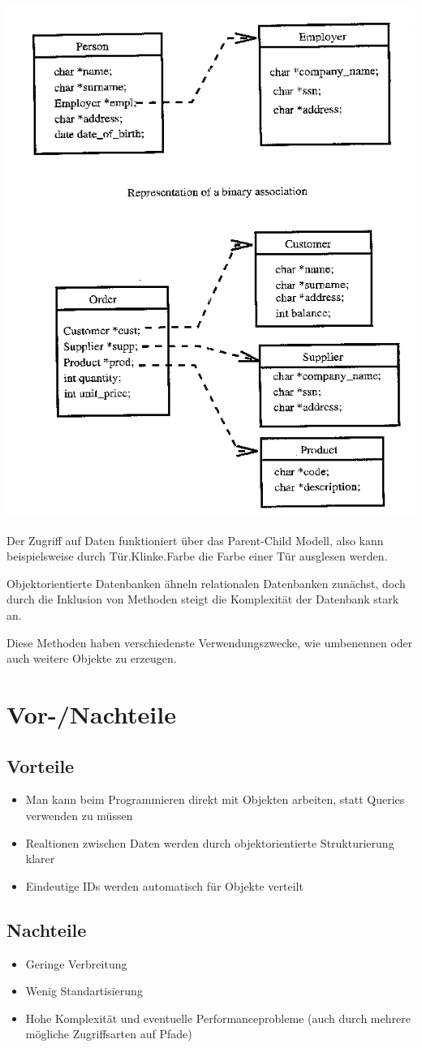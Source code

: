\documentclass{article}
\begin{document}
\includegraphics[scale=0.3]{Attributes.png}

Der Zugriff auf Daten funktioniert über das Parent-Child Modell, also kann beispielsweise durch Tür.Klinke.Farbe die Farbe einer Tür ausglesen werden.

Objektorientierte Datenbanken ähneln relationalen Datenbanken zunächst, doch durch die Inklusion von Methoden steigt die Komplexität der Datenbank stark an.

Diese Methoden haben verschiedenste Verwendungszwecke, wie umbenennen oder auch weitere Objekte zu erzeugen.


\section{Vor-/Nachteile}
\subsection{Vorteile}
\begin{itemize}
	\item Man kann beim Programmieren direkt mit Objekten arbeiten, statt Queries verwenden zu müssen
	\item Realtionen zwischen Daten werden durch objektorientierte Strukturierung klarer
	\item Eindeutige IDs werden automatisch für Objekte verteilt
\end{itemize}
\subsection{Nachteile}
\begin{itemize}
	\item Geringe Verbreitung
	\item Wenig Standartisierung
	\item Hohe Komplexität und eventuelle Performanceprobleme (auch durch mehrere mögliche Zugriffsarten auf Pfade)
\end{itemize}
\end{document}
